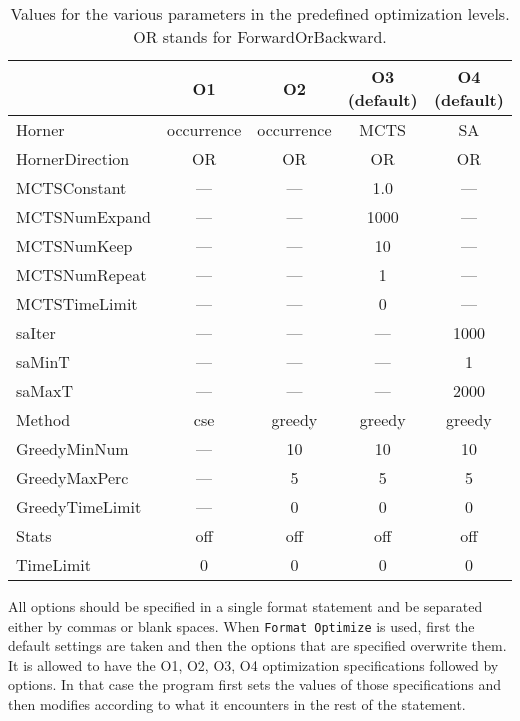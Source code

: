 { \small
\begin{table}[!ht]
\centering
\begin{tabular}{|l|c|c|c|c|}
\hline
                &     O1      &    O2       & O3 (default) & O4 (default) \\
 \hline
Horner          &  occurrence &  occurrence &   MCTS  &      SA     \\
HornerDirection &     OR      &      OR     &    OR   &      OR     \\
MCTSConstant    &    ---      &     ---     &   1.0   &     ---     \\
MCTSNumExpand   &    ---      &     ---     &  1000   &     ---     \\
MCTSNumKeep     &    ---      &     ---     &   10    &     ---     \\
MCTSNumRepeat   &    ---      &     ---     &    1    &     ---     \\
MCTSTimeLimit   &    ---      &     ---     &    0    &     ---     \\
saIter          &    ---      &     ---     &   ---   &     1000    \\
saMinT          &    ---      &     ---     &   ---   &      1      \\
saMaxT          &    ---      &     ---     &   ---   &     2000    \\
Method          &    cse      &    greedy   &  greedy &    greedy   \\
GreedyMinNum    &    ---      &     10      &   10    &     10      \\
GreedyMaxPerc   &    ---      &      5      &    5    &      5      \\
GreedyTimeLimit &    ---      &      0      &    0    &      0      \\
Stats           &    off      &     off     &   off   &     off     \\ 
TimeLimit       &     0       &      0      &    0    &      0      \\
\hline
\end{tabular}
\caption{Values for the various parameters in the predefined
  optimization levels. OR stands for ForwardOrBackward.}
\label{tbl:defaults}
\end{table}
} 

All options should be specified in a single format statement and be
separated either by commas or blank spaces. When
\verb|Format Optimize| is used, first the default settings are taken
and then the options that are specified overwrite them. It is allowed
to have the O1, O2, O3, O4 optimization specifications followed by
options. In that case the program first sets the values of those
specifications and then modifies according to what it encounters in
the rest of the statement.

